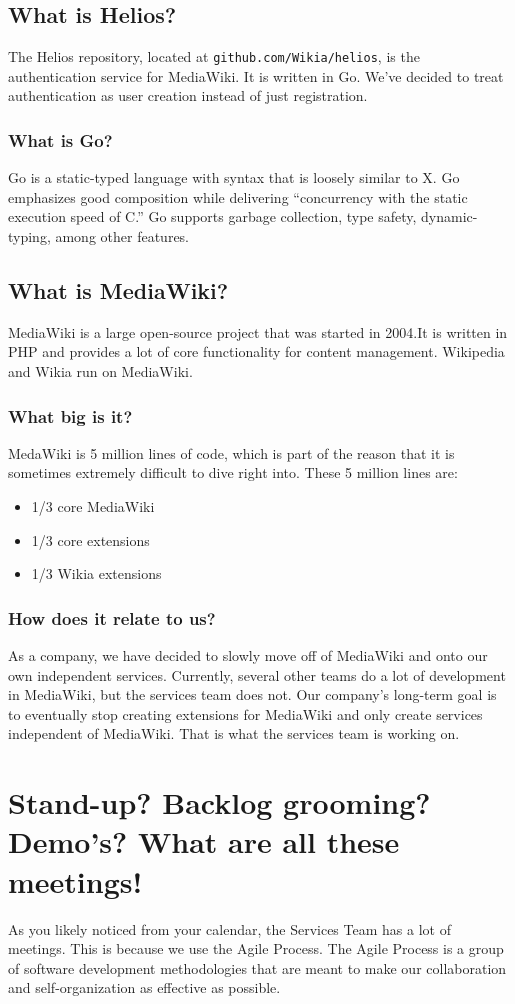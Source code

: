 \documentclass[oneside]{book}
\begin{document}
\section{What is Helios?}
The Helios repository, located at \texttt{github.com/Wikia/helios}, is the authentication service for MediaWiki. It is written in Go. We've decided to treat authentication as user creation instead of just registration.
\subsection{What is Go?}
Go is a static-typed language with syntax that is loosely similar to X. Go emphasizes good composition while delivering “concurrency with the static execution speed of C.” Go supports garbage collection, type safety, dynamic-typing, among other features. 
\section{What is MediaWiki?}
MediaWiki is a large open-source project that was started in 2004.It is written in PHP and provides a lot of core functionality for content management. Wikipedia and Wikia run on MediaWiki. 
\subsection{What big is it?}
MedaWiki is 5 million lines of code, which is part of the reason that it is sometimes extremely difficult to dive right into. These 5 million lines are:
\begin{itemize}
	\item 1/3 core MediaWiki
	\item 1/3 core extensions
	\item 1/3 Wikia extensions
\end{itemize}
\subsection{How does it relate to us?}
As a company, we have decided to slowly move off of MediaWiki and onto our own independent services. Currently, several other teams do a lot of development in MediaWiki, but the services team does not. Our company's long-term goal is to eventually stop creating extensions for MediaWiki and only create services independent of MediaWiki. That is what the services team is working on.
\chapter{Stand-up? Backlog grooming? Demo's? What are all these meetings!}
As you likely noticed from your calendar, the Services Team has a lot of meetings. This is because we use the Agile Process. The Agile Process is a group of software development methodologies that are meant to make our collaboration and self-organization as effective as possible.
\end{document}
